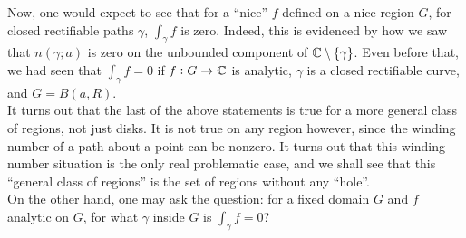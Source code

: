 	Now, one would expect to see that for a ``nice'' $f$ defined on a nice region $G$, for closed rectifiable paths $\gamma$, $\int_\gamma f$ is zero. Indeed, this is evidenced by how we saw that $n(\gamma;a)$ is zero on the unbounded component of $\mathbb{C}\setminus\{\gamma\}$. Even before that, we had seen that $\int_\gamma f = 0$ if $f : G \to \mathbb{C}$ is analytic, $\gamma$ is a closed rectifiable curve, and $G = B(a,R)$.\\
	It turns out that the last of the above statements is true for a more general class of regions, not just disks. It is not true on any region however, since the winding number of a path about a point can be nonzero. It turns out that this winding number situation is the only real problematic case, and we shall see that this ``general class of regions'' is the set of regions without any ``hole''.\\
	On the other hand, one may ask the question: for a fixed domain $G$ and $f$ analytic on $G$, for what $\gamma$ inside $G$ is $\int_\gamma f = 0$?

